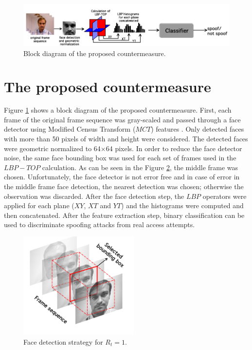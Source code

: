 \begin{figure}[!htb]
\begin{center}
\includegraphics [width=14cm] {images/proposed_countermeasure/countermeasure_2.png}
\caption{Block diagram of the proposed countermeasure.} \label{fig_countermeasure}
\end{center}
\end{figure}

\section{The proposed countermeasure}
\label{sec_proposed_counter}

Figure \ref{fig_countermeasure} shows a block diagram of the proposed countermeasure. First, each frame of the original frame sequence was gray-scaled and passed through a face detector using Modified Census Transform ($MCT$) features \cite{froba2004face}. Only detected faces with more than 50 pixels of width and height were considered. The detected faces were geometric normalized to 64$\times$64 pixels. In order to reduce the face detector noise, the same face bounding box was used for each set of frames used in the $LBP-TOP$ calculation. As can be seen in the Figure \ref{fig_faceDetection}, the middle frame was chosen. Unfortunately, the face detector is not error free and in case of error in the middle frame face detection, the nearest detection was chosen; otherwise the observation was discarded. After the face detection step, the $LBP$ operators were applied for each plane ($XY$, $XT$ and $YT$) and the histograms were computed and then concatenated. After the feature extraction step, binary classification can be used to discriminate spoofing attacks from real access attempts.

\begin{figure}[!htb]
\begin{center}
\includegraphics [width=6cm] {images/proposed_countermeasure/faceDetection_2.png}
\caption{Face detection strategy for $R_t = 1$.} \label{fig_faceDetection}
\end{center}
\end{figure}

